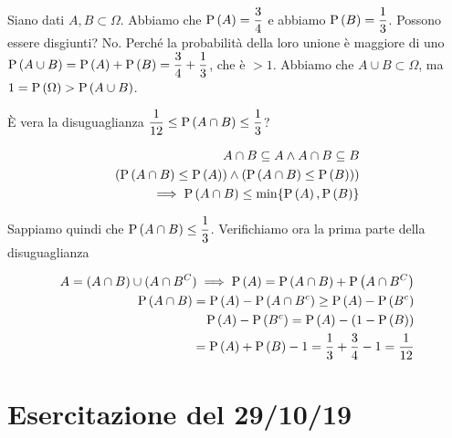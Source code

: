\begin{exrc}
    Siano dati $A,B \subset \Omega$. Abbiamo che $ \text{P}\left(A\right) = \dfrac{3}{4} $ e abbiamo $ \text{P}\left(B\right) = \dfrac{1}{3} $. Possono essere disgiunti? No. Perché la probabilità della loro unione è maggiore di uno $ \text{P}\left(A \cup B\right) = \text{P}\left(A\right) + \text{P}\left(B\right) = \dfrac{3}{4} + \dfrac{1}{3} $, che è $ > 1 $. Abbiamo che $ A \cup B \subset \Omega $, ma $ 1 = \text{P}\left(\Omega\right) > \text{P}\left(A \cup B\right) $. 
    
    È vera la disuguaglianza $ \dfrac{1}{12} \leq \text{P}\left(A \cap B\right) \leq \dfrac{1}{3} $?
    
    \begin{equation*}
    \begin{aligned}
    A \cap B \subseteq A \land A \cap B \subseteq B \\
    (\text{P}\left(A \cap B\right) \leq \text{P}\left(A\right)) \land (\text{P}\left(A \cap B\right) \leq \text{P}\left(B\right))) \\
    \implies \text{P}\left(A \cap B\right) \leq \min\{\text{P}\left(A\right), \text{P}\left(B\right)\} \\
    \end{aligned} 
    \end{equation*}
    
    Sappiamo quindi che $ \text{P}\left(A \cap B\right) \leq \dfrac{1}{3} $. Verifichiamo ora la prima parte della disuguaglianza
    
    \begin{equation*}
    \begin{aligned}
    A = (A \cap B) \cup (A \cap B^C) \implies \text{P}\left(A\right) = \text{P}\left(A \cap B\right) + \text{P}\left(A \cap B^C\right) \\
    \text{P}\left(A \cap B\right) = \text{P}\left(A\right) - \text{P}\left(A \cap B^c\right) \geq \text{P}\left(A\right) - \text{P}\left(B^c\right) \\
    \text{P}\left(A\right) - \text{P}\left(B^c\right) = \text{P}\left(A\right) - (1-\text{P}\left(B\right)) \\ 
    = \text{P}\left(A\right) + \text{P}\left(B\right) - 1 = \dfrac{1}{3} + \dfrac{3}{4} - 1 = \dfrac{1}{12}
    \end{aligned}
    \end{equation*}
\end{exrc} 

\section{Esercitazione del 29/10/19}

